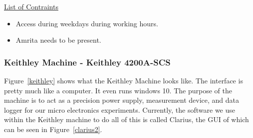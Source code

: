 \documentclass{article}
\begin{document}
          \underline{List of Contraints}
          \begin{itemize}
            \item Access during weekdays during working hours.
            \item Amrita needs to be present.
          \end{itemize}
        
        \newpage
        \subsubsection{Keithley Machine - Keithley 4200A-SCS} 
          Figure~\ref{keithley} shows what the Keithley Machine looks like. The interface is pretty much like a
          computer. It even runs windows 10. The purpose of the machine is to act as a precision power supply,
          measurement device, and data logger for our micro electronics experiments. Currently, the software we use
          within the Keithley machine to do all of this is called Clarius, the GUI of which can be seen in
          Figure~\ref{clarius2}.
\end{document}
